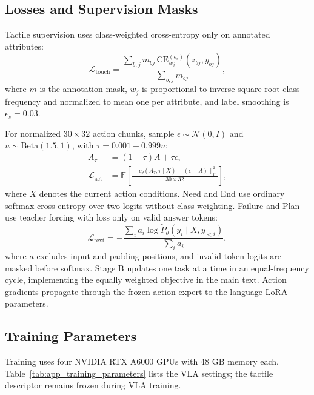 \subsection{Losses and Supervision Masks}

Tactile supervision uses class-weighted cross-entropy only on annotated attributes:
\begin{equation}
\mathcal{L}_{\mathrm{touch}}=
\frac{\sum_{b,j}m_{bj}\,\mathrm{CE}_{w_j}^{(\epsilon_s)}(z_{bj},y_{bj})}
{\sum_{b,j}m_{bj}},
\end{equation}
where $m$ is the annotation mask, $w_j$ is proportional to inverse square-root class frequency and normalized to mean one per attribute, and label smoothing is $\epsilon_s=0.03$.

For normalized $30\times32$ action chunks, sample $\epsilon\sim\mathcal{N}(0,I)$ and $u\sim\mathrm{Beta}(1.5,1)$, with $\tau=0.001+0.999u$:
\begin{equation}
\begin{aligned}
A_\tau&=(1-\tau)A+\tau\epsilon,\\
\mathcal{L}_{\mathrm{act}}&=
\mathbb{E}\!\left[\frac{\|v_\theta(A_\tau,\tau\mid X)-(\epsilon-A)\|_F^2}{30\times32}\right],
\end{aligned}
\end{equation}
where $X$ denotes the current action conditions. Need and End use ordinary softmax cross-entropy over two logits without class weighting. Failure and Plan use teacher forcing with loss only on valid answer tokens:
\begin{equation}
\mathcal{L}_{\mathrm{text}}=
-\frac{\sum_i a_i\log\widetilde P_\theta(y_i\mid X,y_{<i})}{\sum_i a_i},
\end{equation}
where $a$ excludes input and padding positions, and invalid-token logits are masked before softmax. Stage B updates one task at a time in an equal-frequency cycle, implementing the equally weighted objective in the main text. Action gradients propagate through the frozen action expert to the language LoRA parameters.

\subsection{Training Parameters}

Training uses four NVIDIA RTX A6000 GPUs with 48 GB memory each. Table~\ref{tab:app_training_parameters} lists the VLA settings; the tactile descriptor remains frozen during VLA training.

